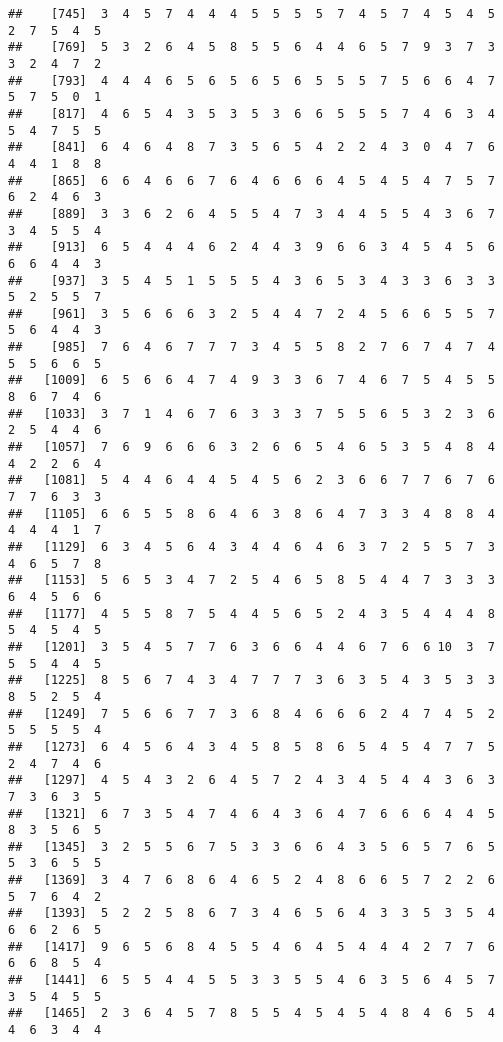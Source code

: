 \documentclass[
]{book}
\begin{document}
\begin{verbatim}
##    [745]  3  4  5  7  4  4  4  5  5  5  5  7  4  5  7  4  5  4  5  2  7  5  4  5
##    [769]  5  3  2  6  4  5  8  5  5  6  4  4  6  5  7  9  3  7  3  3  2  4  7  2
##    [793]  4  4  4  6  5  6  5  6  5  6  5  5  5  7  5  6  6  4  7  5  7  5  0  1
##    [817]  4  6  5  4  3  5  3  5  3  6  6  5  5  5  7  4  6  3  4  5  4  7  5  5
##    [841]  6  4  6  4  8  7  3  5  6  5  4  2  2  4  3  0  4  7  6  4  4  1  8  8
##    [865]  6  6  4  6  6  7  6  4  6  6  6  4  5  4  5  4  7  5  7  6  2  4  6  3
##    [889]  3  3  6  2  6  4  5  5  4  7  3  4  4  5  5  4  3  6  7  3  4  5  5  4
##    [913]  6  5  4  4  4  6  2  4  4  3  9  6  6  3  4  5  4  5  6  6  6  4  4  3
##    [937]  3  5  4  5  1  5  5  5  4  3  6  5  3  4  3  3  6  3  3  5  2  5  5  7
##    [961]  3  5  6  6  6  3  2  5  4  4  7  2  4  5  6  6  5  5  7  5  6  4  4  3
##    [985]  7  6  4  6  7  7  7  3  4  5  5  8  2  7  6  7  4  7  4  5  5  6  6  5
##   [1009]  6  5  6  6  4  7  4  9  3  3  6  7  4  6  7  5  4  5  5  8  6  7  4  6
##   [1033]  3  7  1  4  6  7  6  3  3  3  7  5  5  6  5  3  2  3  6  2  5  4  4  6
##   [1057]  7  6  9  6  6  6  3  2  6  6  5  4  6  5  3  5  4  8  4  4  2  2  6  4
##   [1081]  5  4  4  6  4  4  5  4  5  6  2  3  6  6  7  7  6  7  6  7  7  6  3  3
##   [1105]  6  6  5  5  8  6  4  6  3  8  6  4  7  3  3  4  8  8  4  4  4  4  1  7
##   [1129]  6  3  4  5  6  4  3  4  4  6  4  6  3  7  2  5  5  7  3  4  6  5  7  8
##   [1153]  5  6  5  3  4  7  2  5  4  6  5  8  5  4  4  7  3  3  3  6  4  5  6  6
##   [1177]  4  5  5  8  7  5  4  4  5  6  5  2  4  3  5  4  4  4  8  5  4  5  4  5
##   [1201]  3  5  4  5  7  7  6  3  6  6  4  4  6  7  6  6 10  3  7  5  5  4  4  5
##   [1225]  8  5  6  7  4  3  4  7  7  7  3  6  3  5  4  3  5  3  3  8  5  2  5  4
##   [1249]  7  5  6  6  7  7  3  6  8  4  6  6  6  2  4  7  4  5  2  5  5  5  5  4
##   [1273]  6  4  5  6  4  3  4  5  8  5  8  6  5  4  5  4  7  7  5  2  4  7  4  6
##   [1297]  4  5  4  3  2  6  4  5  7  2  4  3  4  5  4  4  3  6  3  7  3  6  3  5
##   [1321]  6  7  3  5  4  7  4  6  4  3  6  4  7  6  6  6  4  4  5  8  3  5  6  5
##   [1345]  3  2  5  5  6  7  5  3  3  6  6  4  3  5  6  5  7  6  5  5  3  6  5  5
##   [1369]  3  4  7  6  8  6  4  6  5  2  4  8  6  6  5  7  2  2  6  5  7  6  4  2
##   [1393]  5  2  2  5  8  6  7  3  4  6  5  6  4  3  3  5  3  5  4  6  6  2  6  5
##   [1417]  9  6  5  6  8  4  5  5  4  6  4  5  4  4  4  2  7  7  6  6  6  8  5  4
##   [1441]  6  5  5  4  4  5  5  3  3  5  5  4  6  3  5  6  4  5  7  3  5  4  5  5
##   [1465]  2  3  6  4  5  7  8  5  5  4  5  4  5  4  8  4  6  5  4  4  6  3  4  4

\end{verbatim}
\end{document}
